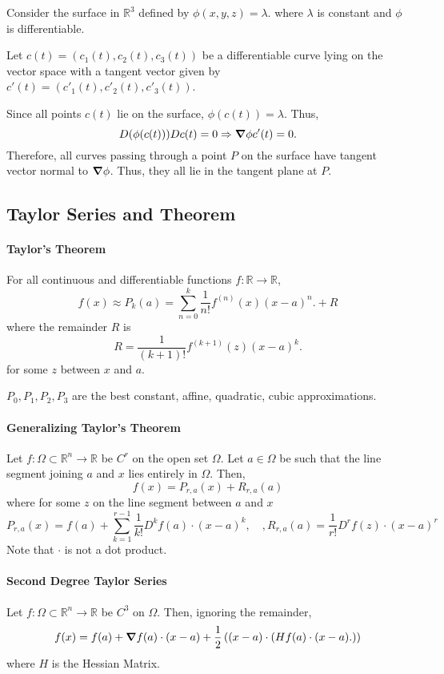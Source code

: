 Consider the surface in \(\mathbb{R}^3\) defined by \(\phi (x, y, z) = \lambda\).
where \(\lambda\) is constant and \(\phi\) is differentiable.

Let \(c(t) = \left(c_1(t), c_2(t), c_3(t)\right)\) be a differentiable curve
lying on the vector space with a tangent vector given by 
\(c'(t) = \left(c'_1(t), c'_2(t), c'_3(t)\right)\).

Since all points \(c(t)\) lie on the surface, \(\phi(c(t)) = \lambda\).
Thus,
\[
    D(\phi (c(t))) Dc(t) = 0 \Rightarrow \grad \phi c'(t) = 0.
\]
Therefore, all curves passing through a point \(P\) on the surface have
tangent vector normal to \(\grad \phi\). Thus, they all lie in the tangent
plane at \(P\).


\subsection{Taylor Series and Theorem}

\paragraph{Taylor's Theorem}
For all continuous and differentiable functions \(f: \mathbb{R}\to \mathbb{R}\),
\[
    f(x)
    \approx
    P_k(a) = 
    \sum_{n=0}^{k} \frac{1}{n!}f^{(n)}(x) (x-a)^n.
    + R
\]
where the remainder \(R\) is
\[
    R = \frac{1}{(k+1)!} f^{(k+1)}(z) (x-a)^k.
\]
for some \(z\) between \(x\) and \(a\).

\(P_0, P_1,  P_2, P_3\) are the best constant, affine, quadratic, cubic approximations.

\paragraph{Generalizing Taylor's Theorem}
Let \(f: \Omega\subset \mathbb{R}^n \to \mathbb{R}\) be \(C^r\) on the 
open set \(\Omega\).
Let \(a\in \Omega\) be such that the line segment joining \(a\) and \(x\)
lies entirely in \(\Omega\).  Then,
\[f(x) = P_{r, a}(x) + R_{r, a}(a)\]
where for some \(z\) on the line segment between \(a\) and \(x\)
\[ 
    P_{r,a}(x) = f(a) + \sum_{k=1}^{r-1} \frac{1}{k!} D^k f(a)\cdot(x-a)^k, 
    \quad,
    R_{r,a}(a) = \frac{1}{r!}D^r f(z) \cdot (x-a)^r
\]
Note that \(\cdot\) is not a dot product.

\paragraph{Second Degree Taylor Series}
Let \(f: \Omega\subset \mathbb{R}^n \to \mathbb{R}\) be \(C^3\) on \(\Omega\).
Then, ignoring the remainder,
\[
    f(x) = f(a) + \grad f(a)\cdot(x-a) 
    +
    \frac{1}{2} \left((x-a)\cdot \left(
        Hf(a)\cdot(x-a).
    \right) \right)
\]
where \(H\) is the Hessian Matrix.

